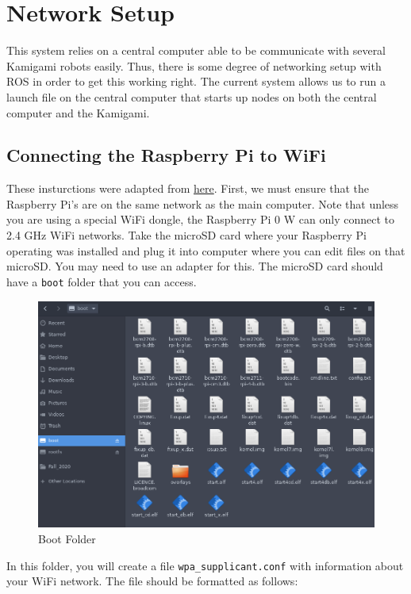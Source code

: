 \documentclass[11pt]{article}
\begin{document}
\section{Network Setup}
This system relies on a central computer able to be communicate with several Kamigami robots easily. Thus, there is some degree of networking setup with ROS in order to get this working right. The current system allows us to run a launch file on the central computer that starts up nodes on both the central computer and the Kamigami.

\subsection{Connecting the Raspberry Pi to WiFi}
These insturctions were adapted from \href{https://www.raspberrypi.org/documentation/configuration/wireless/headless.md}{here}.
\vspace{2mm}
\newline
First, we must ensure that the Raspberry Pi's are on the same network as the main computer. Note that unless you are using a special WiFi dongle, the Raspberry Pi 0 W can only connect to 2.4 GHz WiFi networks. Take the microSD card where your Raspberry Pi operating was installed and plug it into computer where you can edit files on that microSD. You may need to use an adapter for this. The microSD card should have a \verb|boot| folder that you can access.
\begin{figure}[h]
    \centering
    \includegraphics[width=\textwidth]{images/boot.png}
    \caption{Boot Folder}
\end{figure}
\vspace{2mm}
\newline
In this folder, you will create a file \verb|wpa_supplicant.conf| with information about your WiFi network. The file should be formatted as follows:
\end{document}
